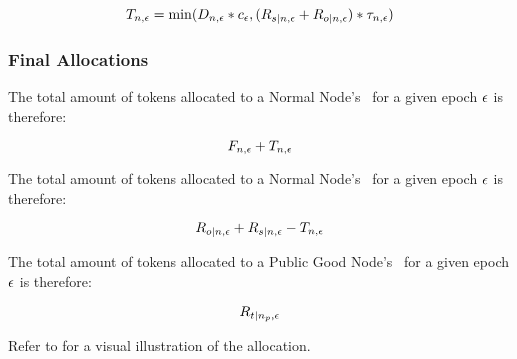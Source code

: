 \begin{equation}
    T_{n, \epsilon} =
    \min(D_{n, \epsilon}
    * c_{\epsilon} , (R_{s|n, \epsilon}
    + R_{o|n, \epsilon} ) 
    * \tau_{n, \epsilon})
\end{equation}

\subsubsection{Final Allocations}
\label{subsubsec:allocation}

The total amount of tokens allocated to a Normal Node's \operationPool\ for a given epoch $\epsilon$ is therefore:

\begin{equation}
    F_{n, \epsilon}
    + T_{n, \epsilon}
\end{equation}

The total amount of tokens allocated to a Normal Node's \stakingPool\ for a given epoch $\epsilon$ is therefore:

\begin{equation}
    R_{o|n, \epsilon}
    + R_{s|n, \epsilon}
    - T_{n, \epsilon}
\end{equation}

The total amount of tokens allocated to a Public Good Node's \publicGoodPool\ for a given epoch $\epsilon$ is therefore:

\begin{equation}
    R_{t|n_p, \epsilon}
\end{equation}


Refer to  for a visual illustration of the  allocation.